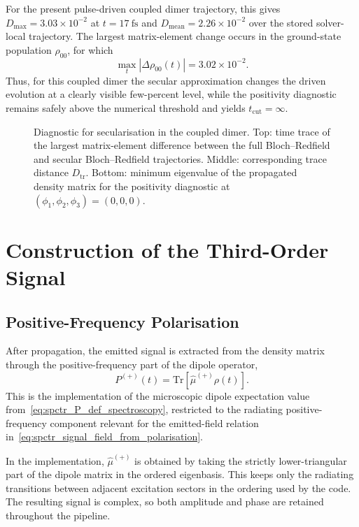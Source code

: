 For the present pulse-driven coupled dimer trajectory, this gives
\(D_{\max}=3.03\times10^{-2}\) at \(t=\SI{17}{\femto\second}\) and
\(D_{\mathrm{mean}}=2.26\times10^{-2}\) over the stored solver-local
trajectory. The largest matrix-element change occurs in the ground-state
population \(\rho_{00}\), for which
\[
\max_t |\Delta\rho_{00}(t)| = 3.02\times10^{-2}.
\]
Thus, for this coupled dimer the secular approximation changes the driven
evolution at a clearly visible few-percent level, while the positivity
diagnostic remains safely above the numerical threshold and yields
\(t_{\mathrm{cut}}=\infty\).

\begin{figure}[htbp]
    \centering
    \caption{Diagnostic for secularisation in the coupled dimer. Top: time trace
    of the largest matrix-element difference between the full Bloch--Redfield
    and secular Bloch--Redfield trajectories. Middle: corresponding trace
    distance \(D_{\mathrm{tr}}\). Bottom: minimum eigenvalue of the propagated
    density matrix for the positivity diagnostic at
    \((\phi_1,\phi_2,\phi_3)=(0,0,0)\).}
    \label{fig:app_dimer_redfield_sec_cutoff_diagnostic}
\end{figure}

\section{Construction of the Third-Order Signal}
\label{app:sec:third_order_polarisation}

\subsection{Positive-Frequency Polarisation}

After propagation, the emitted signal is extracted from the density matrix
through the positive-frequency part of the dipole operator,
\[
P^{(+)}(t)
=
\mathrm{Tr}\!\left[\hat{\mu}^{(+)}\rho(t)\right].
\]
This is the implementation of the microscopic dipole expectation value
from~\autoref{eq:spctr_P_def_spectroscopy}, restricted to the radiating
positive-frequency component relevant for the emitted-field relation
in~\autoref{eq:spctr_signal_field_from_polarisation}.

In the implementation, \(\hat{\mu}^{(+)}\) is obtained by taking the strictly
lower-triangular part of the dipole matrix in the ordered eigenbasis. This
keeps only the radiating transitions between adjacent excitation sectors in the
ordering used by the code. The resulting signal is complex, so both amplitude
and phase are retained throughout the pipeline.

